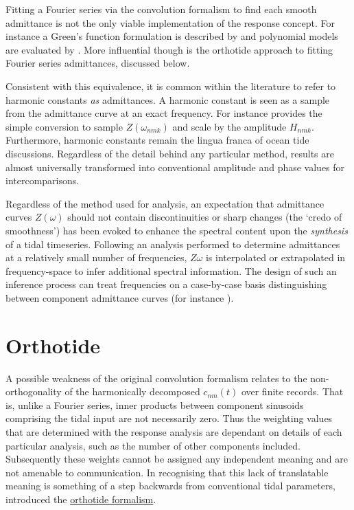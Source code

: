 Fitting a Fourier series via the convolution formalism to find each smooth admittance is not the only viable implementation of the response concept.  For instance a Green's function formulation is described by \citet{Webb:1974ke} and polynomial models are evaluated by \citet{Desai:1995je}. More influential though is the orthotide approach to fitting Fourier series admittances, discussed below.


Consistent with this equivalence, it is common within the literature to refer to harmonic constants \emph{as} admittances.   A harmonic constant is seen as a sample from the admittance curve at an exact frequency. For instance \citet{Smith:1997ut} provides the simple conversion to sample $Z(\omega_{nmk})$ and scale by the \ATGP{} amplitude $H_{nmk}$.
Furthermore, harmonic constants remain the lingua franca of ocean tide discussions. Regardless of the detail behind any particular method, results are almost universally transformed into conventional amplitude and phase values for intercomparisons.


Regardless of the method used for analysis, an expectation that admittance curves $Z(\omega)$ should not contain discontinuities or sharp changes (the `credo of smoothness') has been evoked to enhance the spectral content upon the \emph{synthesis} of a tidal timeseries.  Following an analysis performed to determine admittances at a relatively small number of frequencies, $Z{\omega}$ is interpolated or extrapolated in frequency-space to infer additional spectral information.   The design of such an inference process can treat frequencies on a case-by-case basis distinguishing between component admittance curves (for instance \citet[pp 268]{Fu:2001ub}).

\section{Orthotide}%
A possible weakness of the original convolution formalism relates to the non-orthogonality of the harmonically decomposed $c_{nm}(t)$ over finite records.  That is, unlike a Fourier series, inner products between component sinusoids comprising the tidal input are not necessarily zero.   Thus the weighting values that are determined with the response analysis are dependant on details of each particular analysis, such as the number of other components included.  Subsequently these weights cannot be assigned any independent meaning and are not amenable to communication.  
In recognising that this lack of translatable meaning is something of a step backwards from conventional tidal parameters, \citet{Groves:1975ky} introduced the \underline{orthotide formalism}.

